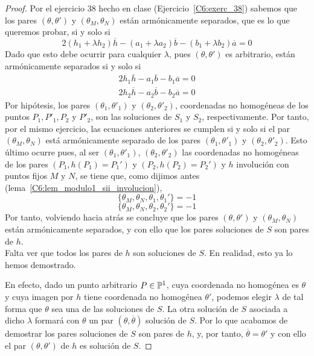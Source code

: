 \begin{proof}
	Por el ejercicio 38 hecho en clase (Ejercicio~\ref{C6:exerc_38}) sabemos que los pares $(\theta,\theta')$ y $(\theta_M,\theta_N)$ están armónicamente separados, que es lo que queremos probar, si y solo si
	\begin{equation*}
		2(h_1+\lambda h_2)\overline{h}-(a_1+\lambda a_2)\overline{b}-(b_1+\lambda b_2)\overline{a}=0
	\end{equation*}
	Dado que esto debe ocurrir para cualquier $\lambda$, pues $(\theta,\theta')$ es arbitrario, están armónicamente separados si y solo si
	\begin{equation*}
		\begin{split}
			2h_1\overline{h}-a_1\overline{b}-b_1\overline{a}=0\\
			2h_2\overline{h}-a_2\overline{b}-b_2\overline{a}=0
		\end{split}
	\end{equation*}
	Por hipótesis, los pares $(\theta_1,\theta'_1)$ y $(\theta_2,\theta'_2)$, coordenadas no homogéneas de los puntos $P_1,P'_1,P_2$ y $P'_2$, son las soluciones de $S_1$ y $S_2$, respectivamente. Por tanto, por el mismo ejercicio, las ecuaciones anteriores se cumplen si y solo si el par $(\theta_M,\theta_N)$ está armónicamente separado de los pares $(\theta_1,\theta'_1)$ y $(\theta_2,\theta'_2)$. Esto último ocurre pues, al ser $(\theta_1,\theta'_1)$, $(\theta_2,\theta'_2)$ las coordenadas no homogéneas de los pares $(P_1,h(P_1)=P_1')$ y $(P_2,h(P_2)=P_2')$ y $h$ involución con puntos fijos $M$ y $N$, se tiene que, como dijimos antes (lema~\ref{C6:lem_modulo1_sii_involucion}),
	\begin{equation*}
		\{\theta_M,\theta_N,\theta_1,\theta_1'\}=-1
	\end{equation*}
	\begin{equation*}
		\{\theta_M,\theta_N,\theta_2,\theta_2'\}=-1
	\end{equation*}
	Por tanto, volviendo hacia atrás se concluye que los pares $(\theta,\theta')$ y $(\theta_M,\theta_N)$ están armónicamente separados, y con ello que los pares soluciones de $S$ son pares de $h$.\\
	
	Falta ver que todos los pares de $h$ son soluciones de $S$. En realidad, esto ya lo hemos demostrado.
	
	En efecto, dado un punto arbitrario $P\in\mathbb{P}^1$, cuya coordenada no homogénea es $\theta$ y cuya imagen por $h$ tiene coordenada no homogénea $\theta'$, podemos elegir $\lambda$ de tal forma que $\theta$ sea una de las soluciones de $S$. La otra solución de $S$ asociada a dicho $\lambda$ formará con $\theta$ un par $(\theta,\overline{\theta})$ solución de $S$. Por lo que acabamos de demostrar los pares soluciones de $S$ son pares de $h$, y, por tanto, $\overline{\theta}=\theta'$ y con ello el par $(\theta,\theta')$ de $h$ es solución de $S$.
\end{proof}
